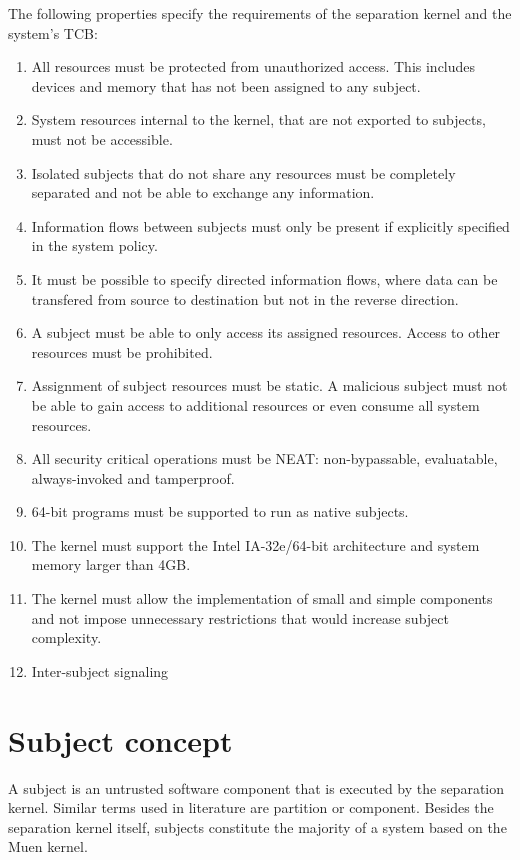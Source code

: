 The following properties specify the requirements of the separation kernel and
the system's TCB:
\begin{enumerate}
	\item All resources must be protected from unauthorized access. This
		includes devices and memory that has not been assigned to any subject.
	\item System resources internal to the kernel, that are not exported to
		subjects, must not be accessible.
	\item Isolated subjects that do not share any resources must be completely
		separated and not be able to exchange any information.
	\item Information flows between subjects must only be present if explicitly
		specified in the system policy.
	\item It must be possible to specify directed information flows, where data
		can be transfered from source to destination but not in the reverse
		direction.
	\item A subject must be able to only access its assigned resources. Access
		to other resources must be prohibited.
	\item Assignment of subject resources must be static. A malicious subject
		must not be able to gain access to additional resources or even consume
		all system resources.
	\item All security critical operations must be NEAT: non-bypassable,
		evaluatable, always-invoked and tamperproof.
	\item 64-bit programs must be supported to run as native subjects.
	\item The kernel must support the Intel IA-32e/64-bit architecture and
		system memory larger than 4GB.
	\item The kernel must allow the implementation of small and simple
		components and not impose unnecessary restrictions that would increase
		subject complexity.
	\item Inter-subject signaling
\end{enumerate}

\section{Subject concept}
A subject is an untrusted software component that is executed by the separation
kernel. Similar terms used in literature are partition or component. Besides the
separation kernel itself, subjects constitute the majority of a system based on
the Muen kernel.

